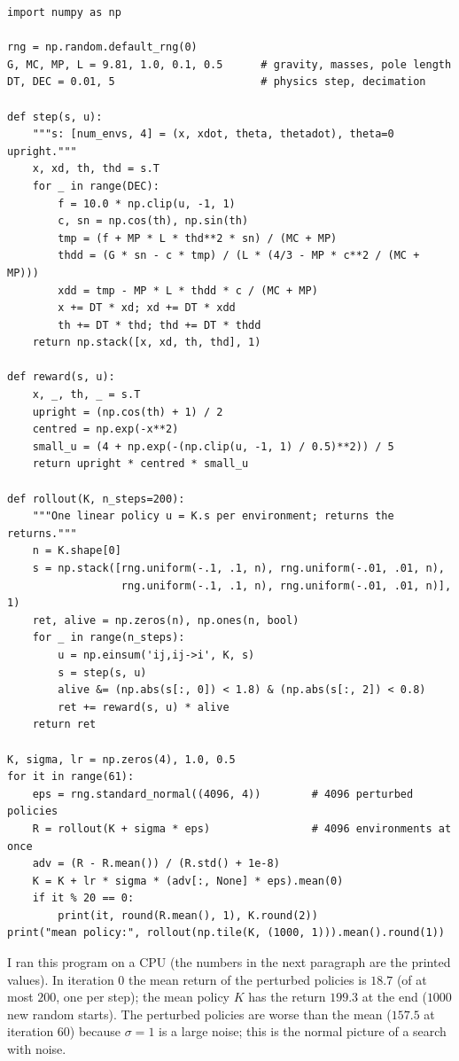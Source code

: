 \begin{verbatim}
import numpy as np

rng = np.random.default_rng(0)
G, MC, MP, L = 9.81, 1.0, 0.1, 0.5      # gravity, masses, pole length
DT, DEC = 0.01, 5                       # physics step, decimation

def step(s, u):
    """s: [num_envs, 4] = (x, xdot, theta, thetadot), theta=0 upright."""
    x, xd, th, thd = s.T
    for _ in range(DEC):
        f = 10.0 * np.clip(u, -1, 1)
        c, sn = np.cos(th), np.sin(th)
        tmp = (f + MP * L * thd**2 * sn) / (MC + MP)
        thdd = (G * sn - c * tmp) / (L * (4/3 - MP * c**2 / (MC + MP)))
        xdd = tmp - MP * L * thdd * c / (MC + MP)
        x += DT * xd; xd += DT * xdd
        th += DT * thd; thd += DT * thdd
    return np.stack([x, xd, th, thd], 1)

def reward(s, u):
    x, _, th, _ = s.T
    upright = (np.cos(th) + 1) / 2
    centred = np.exp(-x**2)
    small_u = (4 + np.exp(-(np.clip(u, -1, 1) / 0.5)**2)) / 5
    return upright * centred * small_u

def rollout(K, n_steps=200):
    """One linear policy u = K.s per environment; returns the returns."""
    n = K.shape[0]
    s = np.stack([rng.uniform(-.1, .1, n), rng.uniform(-.01, .01, n),
                  rng.uniform(-.1, .1, n), rng.uniform(-.01, .01, n)], 1)
    ret, alive = np.zeros(n), np.ones(n, bool)
    for _ in range(n_steps):
        u = np.einsum('ij,ij->i', K, s)
        s = step(s, u)
        alive &= (np.abs(s[:, 0]) < 1.8) & (np.abs(s[:, 2]) < 0.8)
        ret += reward(s, u) * alive
    return ret

K, sigma, lr = np.zeros(4), 1.0, 0.5
for it in range(61):
    eps = rng.standard_normal((4096, 4))        # 4096 perturbed policies
    R = rollout(K + sigma * eps)                # 4096 environments at once
    adv = (R - R.mean()) / (R.std() + 1e-8)
    K = K + lr * sigma * (adv[:, None] * eps).mean(0)
    if it % 20 == 0:
        print(it, round(R.mean(), 1), K.round(2))
print("mean policy:", rollout(np.tile(K, (1000, 1))).mean().round(1))
\end{verbatim}

I ran this program on a CPU (the numbers in the next paragraph are the printed values). In iteration $0$ the mean return of the perturbed policies is $18.7$ (of at most $200$, one per step); the mean policy $K$ has the return $199.3$ at the end ($1000$ new random starts). The perturbed policies are worse than the mean ($157.5$ at iteration $60$) because $\sigma=1$ is a large noise; this is the normal picture of a search with noise.

